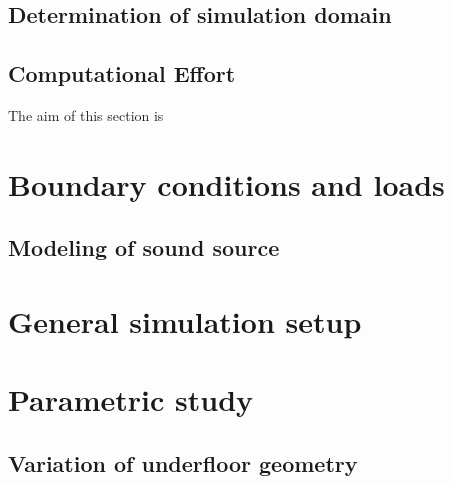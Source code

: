 \subsection{Determination of simulation domain}
\subsection{Computational Effort}
The aim of this section is 

\section{Boundary conditions and loads}
\label{section:boundary_conditions}
\subsection{Modeling of sound source}

\section{General simulation setup}

\section{Parametric study}
\label{section:parametric_study}
\subsection{Variation of underfloor geometry}

